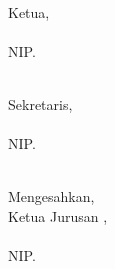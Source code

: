 \begin{center}\hspace{1cm}
    \begin{minipage}{0.32\textwidth}
        \hfill\\[1em]
        Ketua,\\[2cm]
        \ketuapenguji\\
        NIP. \NIPketuapenguji
    \end{minipage}
\hfill    
    \begin{minipage}{0.32\textwidth}
        \hfill\\[1em]
        Sekretaris,\\[2cm]
        \sekretaris\\
        NIP. \NIPsekretaris
    \end{minipage}
\end{center}    

\begin{center}
    
    \begin{minipage}{0.45\textwidth}
    \hfill\\[2em]
    \centering
    Mengesahkan,\\
    Ketua Jurusan {\jurusan},\\[2cm]
    \ketuajurusan\\
    NIP. \NIPketuajurusan
\end{minipage}
\end{center}

